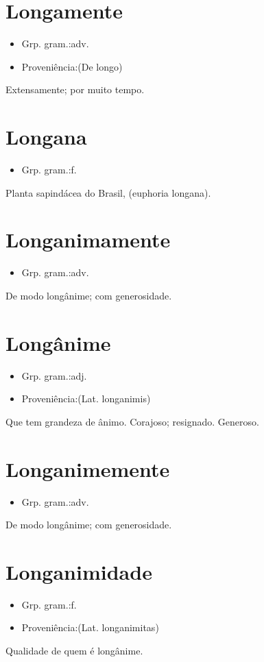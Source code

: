 \section{Longamente}
\begin{itemize}
\item {Grp. gram.:adv.}
\end{itemize}
\begin{itemize}
\item {Proveniência:(De \textunderscore longo\textunderscore )}
\end{itemize}
Extensamente; por muito tempo.
\section{Longana}
\begin{itemize}
\item {Grp. gram.:f.}
\end{itemize}
Planta sapindácea do Brasil, (\textunderscore euphoria longana\textunderscore ).
\section{Longanimamente}
\begin{itemize}
\item {Grp. gram.:adv.}
\end{itemize}
De modo longânime; com generosidade.
\section{Longânime}
\begin{itemize}
\item {Grp. gram.:adj.}
\end{itemize}
\begin{itemize}
\item {Proveniência:(Lat. \textunderscore longanimis\textunderscore )}
\end{itemize}
Que tem grandeza de ânimo.
Corajoso; resignado.
Generoso.
\section{Longanimemente}
\begin{itemize}
\item {Grp. gram.:adv.}
\end{itemize}
De modo longânime; com generosidade.
\section{Longanimidade}
\begin{itemize}
\item {Grp. gram.:f.}
\end{itemize}
\begin{itemize}
\item {Proveniência:(Lat. \textunderscore longanimitas\textunderscore )}
\end{itemize}
Qualidade de quem é longânime.
